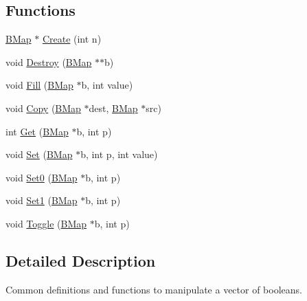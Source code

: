 \subsection*{Functions}
\begin{DoxyCompactItemize}
\item 
\hyperlink{namespacegft_1_1BMap_a8f2cf1208156e700ed4ee3266e9608a3}{B\-Map} $\ast$ \hyperlink{namespacegft_1_1BMap_a2fa05fc6252377c429e9e4a6f9deb48e}{Create} (int n)
\item 
void \hyperlink{namespacegft_1_1BMap_ae0ac845f44b759496c68f587b0eb61c7}{Destroy} (\hyperlink{namespacegft_1_1BMap_a8f2cf1208156e700ed4ee3266e9608a3}{B\-Map} $\ast$$\ast$b)
\item 
void \hyperlink{namespacegft_1_1BMap_aca9363f4ab0f57c0c8d25280148973af}{Fill} (\hyperlink{namespacegft_1_1BMap_a8f2cf1208156e700ed4ee3266e9608a3}{B\-Map} $\ast$b, int value)
\item 
void \hyperlink{namespacegft_1_1BMap_a9b988dc9df9d88e87e41ece4359d3dac}{Copy} (\hyperlink{namespacegft_1_1BMap_a8f2cf1208156e700ed4ee3266e9608a3}{B\-Map} $\ast$dest, \hyperlink{namespacegft_1_1BMap_a8f2cf1208156e700ed4ee3266e9608a3}{B\-Map} $\ast$src)
\item 
int \hyperlink{namespacegft_1_1BMap_ac9c2e8f32c8f11a64217cbbc3f3d0109}{Get} (\hyperlink{namespacegft_1_1BMap_a8f2cf1208156e700ed4ee3266e9608a3}{B\-Map} $\ast$b, int p)
\item 
void \hyperlink{namespacegft_1_1BMap_a287294d475dc6379a66312d90d1f31a5}{Set} (\hyperlink{namespacegft_1_1BMap_a8f2cf1208156e700ed4ee3266e9608a3}{B\-Map} $\ast$b, int p, int value)
\item 
void \hyperlink{namespacegft_1_1BMap_a499d41c0bc16d3798afcdfaafc138077}{Set0} (\hyperlink{namespacegft_1_1BMap_a8f2cf1208156e700ed4ee3266e9608a3}{B\-Map} $\ast$b, int p)
\item 
void \hyperlink{namespacegft_1_1BMap_ac1fd70d8535973339795337d4c2d42bc}{Set1} (\hyperlink{namespacegft_1_1BMap_a8f2cf1208156e700ed4ee3266e9608a3}{B\-Map} $\ast$b, int p)
\item 
void \hyperlink{namespacegft_1_1BMap_af3dde81bb441bb44cee40b7e801bf32d}{Toggle} (\hyperlink{namespacegft_1_1BMap_a8f2cf1208156e700ed4ee3266e9608a3}{B\-Map} $\ast$b, int p)
\end{DoxyCompactItemize}


\subsection{Detailed Description}
Common definitions and functions to manipulate a vector of booleans. 

